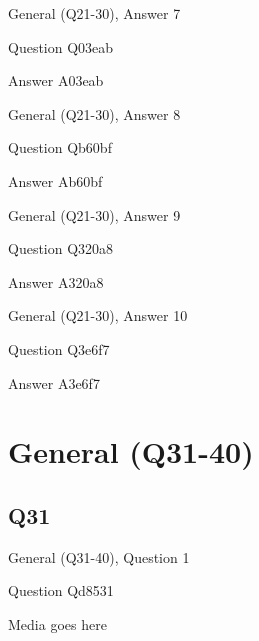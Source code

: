 \documentclass[11pt]{beamer}
\begin{document}
\begin{frame}[t]{General (Q21-30), Answer 7}
\vspace{2em}
\begin{block}{Question}
Q03eab
\end{block}
\pause{}
\begin{block}{Answer}
A03eab
\end{block}
\end{frame}
    

\begin{frame}[t]{General (Q21-30), Answer 8}
\vspace{2em}
\begin{block}{Question}
Qb60bf
\end{block}
\pause{}
\begin{block}{Answer}
Ab60bf
\end{block}
\end{frame}
    

\begin{frame}[t]{General (Q21-30), Answer 9}
\vspace{2em}
\begin{block}{Question}
Q320a8
\end{block}
\pause{}
\begin{block}{Answer}
A320a8
\end{block}
\end{frame}
    

\begin{frame}[t]{General (Q21-30), Answer 10}
\vspace{2em}
\begin{block}{Question}
Q3e6f7
\end{block}
\pause{}
\begin{block}{Answer}
A3e6f7
\end{block}
\end{frame}
    

\section{General (Q31-40)}
    

\subsection*{Q31}
\begin{frame}[t]{General (Q31-40), Question 1}
\vspace{2em}
\begin{block}{Question}
Qd8531
\end{block}
\begin{center}
Media goes here
\end{center}
\end{frame}
    
\end{document}

